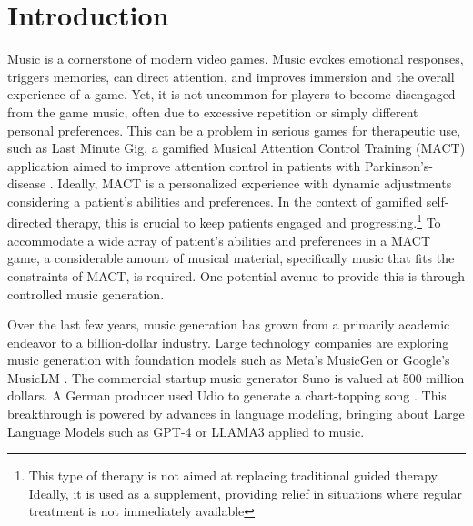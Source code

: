 

\chapter{Introduction}
\label{chap:intro}
\pagestyle{fancy}

Music is a cornerstone of modern video games. Music evokes emotional responses, triggers memories, can direct attention, and improves immersion and the overall experience of a game. Yet, it is not uncommon for players to become disengaged from the game music, often due to excessive repetition or simply different personal preferences.\cite{Rogers_Weber_2019} This can be a problem in serious games for therapeutic use, such as Last Minute Gig, a gamified Musical Attention Control Training (MACT) application aimed to improve attention control in patients with Parkinson's-disease \cite{Chalkiadakis_2022}. Ideally, MACT is a personalized experience with dynamic adjustments considering a patient's abilities and preferences. In the context of gamified self-directed therapy, this is crucial to keep patients engaged and progressing.\footnote{This type of therapy is not aimed at replacing traditional guided therapy. Ideally, it is used as a supplement,  providing relief in situations where regular treatment is not immediately available} To accommodate a wide array of patient's abilities and preferences in a MACT game, a considerable amount of musical material, specifically music that fits the constraints of MACT, is required. One potential avenue to provide this is through controlled music generation.

Over the last few years, music generation has grown from a primarily academic endeavor to a billion-dollar industry. Large technology companies are exploring music generation with foundation models such as Meta’s MusicGen\cite{copet2023simple} or Google’s MusicLM 
\cite{Agostinelli_Denk_Borsos_Engel_Verzetti_Caillon_Huang_Jansen_Roberts_Tagliasacchi_et_al._2023}. The commercial startup music generator Suno is valued at 500 million dollars. A German producer used Udio to generate a chart-topping song \cite{Ferdinand_Meyen_2024}\cite{Stassen_2024}. This breakthrough is powered by advances in language modeling, bringing about Large Language Models such as GPT-4 or LLAMA3 applied to music.

